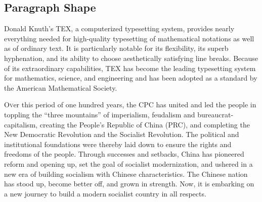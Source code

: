 \documentclass{article}
\begin{document}
        \subsection{Paragraph Shape}
            {
                \hangindent=5pc            %
                Donald Knuth’s TEX, a computerized typesetting system, provides nearly
                everything needed for high-quality typesetting of mathematical notations
                as well as of ordinary text. It is particularly notable for its flexibility, its
                superb hyphenation, and its ability to choose aesthetically satisfying line
                breaks. Because of its extraordinary capabilities, TEX has become the
                leading typesetting system for mathematics, science, and engineering and
                has been adopted as a standard by the American Mathematical Society. 
            }\par
            {
                \lettrine{O}ver this period of one hundred years, the CPC has united and 
                led the people in toppling the “three mountains” of imperialism, feudalism 
                and bureaucrat-capitalism, creating the People’s Republic of China (PRC), and 
                completing the New Democratic Revolution and the Socialist Revolution. The 
                political and institutional foundations were thereby laid down to ensure 
                the rights and freedoms of the people. Through successes and setbacks, 
                China has pioneered reform and opening up, set the goal of socialist modernization, 
                and ushered in a new era of building socialism with Chinese characteristics. 
                The Chinese nation has stood up, become better off, and grown in strength. 
                Now, it is embarking on a new journey to build a modern socialist country in all respects.
            }\par 
\end{document}
